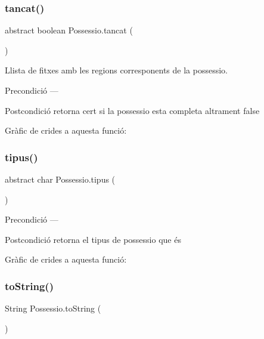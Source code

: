 \subsubsection{\texorpdfstring{tancat()}{tancat()}}
{\footnotesize\ttfamily abstract boolean Possessio.\+tancat (\begin{DoxyParamCaption}{ }\end{DoxyParamCaption})\hspace{0.3cm}{\ttfamily [abstract]}}



Llista de fitxes amb les regions corresponents de la possessio. 

\begin{DoxyPrecond}{Precondició}
--- 
\end{DoxyPrecond}
\begin{DoxyPostcond}{Postcondició}
retorna cert si la possessio esta completa altrament false 
\end{DoxyPostcond}
Gràfic de crides a aquesta funció\+:
\mbox{\label{class_possessio_a3fa7231e1183f1be2882d4977c6a74a7}} 
\subsubsection{\texorpdfstring{tipus()}{tipus()}}
{\footnotesize\ttfamily abstract char Possessio.\+tipus (\begin{DoxyParamCaption}{ }\end{DoxyParamCaption})\hspace{0.3cm}{\ttfamily [abstract]}}

\begin{DoxyPrecond}{Precondició}
--- 
\end{DoxyPrecond}
\begin{DoxyPostcond}{Postcondició}
retorna el tipus de possessio que és 
\end{DoxyPostcond}
Gràfic de crides a aquesta funció\+:
\mbox{\label{class_possessio_a7e75c5f8c1bfa87d1f22049f1109f855}} 
\subsubsection{\texorpdfstring{to\+String()}{toString()}}
{\footnotesize\ttfamily String Possessio.\+to\+String (\begin{DoxyParamCaption}{ }\end{DoxyParamCaption})}

